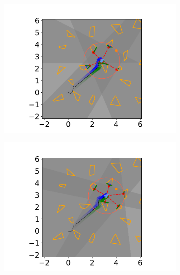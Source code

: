 \begin{figure}[H]
\begin{subfigure}{0.20\textwidth}
        \includegraphics[width=\textwidth]{../figures/Simulations/sim2unkenv/frame_7.pdf}
    \end{subfigure}%
    \hfill
    \begin{subfigure}{0.20\textwidth}
        \centering
        \includegraphics[width=\textwidth]{../figures/Simulations/sim2unkenv/frame_8.pdf}
    \end{subfigure}%
    \hfill
    \begin{subfigure}{0.20\textwidth}
        \centering

\end{subfigure}
\end{figure}
